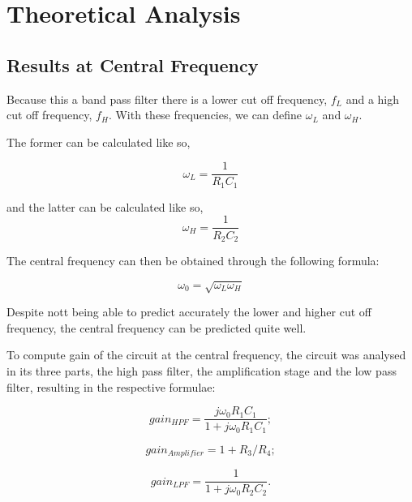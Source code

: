 \section{Theoretical Analysis}
\label{sec:theoretical analysis}

\subsection{Results at Central Frequency}

\indent

Because this a band pass filter there is a lower cut off frequency, $f_L$ and a high cut off frequency, $f_H$. With these frequencies, we can define $\omega_L$ and $\omega_H$.

The former can be calculated like so,


\[\omega_L = \frac{1}{R_1 C_1}\tag{1}\label{1}\]

and the latter can be calculated like so, \[\omega_H = \frac{1}{R_2 C_2}\tag{2}\label{2}\]

The central frequency can then be obtained through the following formula: 

\[\omega _0 =\sqrt{\omega _L \omega _H}\tag{3}\label{3}\]

\vspace{0.5cm}
\begin{center}
\end{center}

Despite nott being able to predict accurately the lower and higher cut off frequency, the central frequency can be predicted quite well. 

\vspace{1cm}

To compute gain of the circuit at the central frequency, the circuit was analysed in its three parts,  the high pass filter, the amplification stage and the low pass filter, resulting in the respective formulae:

\vspace{0.5cm}

\[gain_{HPF}=\frac{j\omega _0 R_1 C_1}{1+j \omega _0 R_1 C_1};\tag{4}\label{4}\]
 
\[gain_{Amplifier}=1+R_3/R_4;\tag{5}\label{5}\]
 
\[gain_{LPF} = \frac{1}{1+j \omega _0 R_2 C_2}.\tag{6}\label{6}\]
 
\vspace{1cm}
 

